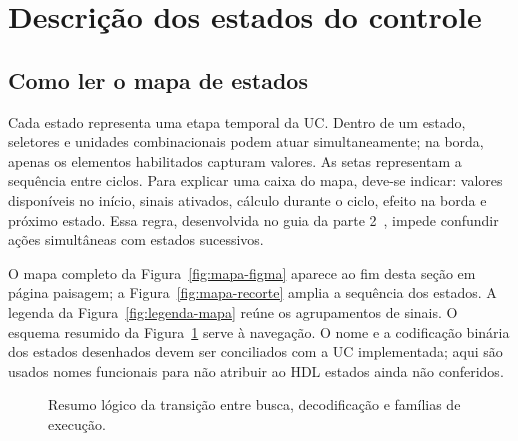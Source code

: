 \section{Descrição dos estados do controle}\label{sec:controle}

\subsection{Como ler o mapa de estados}\label{subsec:leitura-mapa}

Cada estado representa uma etapa temporal da UC. Dentro de um estado, seletores e unidades combinacionais podem atuar simultaneamente; na borda, apenas os elementos habilitados capturam valores. As setas representam a sequência entre ciclos. Para explicar uma caixa do mapa, deve-se indicar: valores disponíveis no início, sinais ativados, cálculo durante o ciclo, efeito na borda e próximo estado. Essa regra, desenvolvida no guia da parte 2~\cite{docpt2}, impede confundir ações simultâneas com estados sucessivos.

O mapa completo da Figura~\ref{fig:mapa-figma} aparece ao fim desta seção em página paisagem; a Figura~\ref{fig:mapa-recorte} amplia a sequência dos estados. A legenda da Figura~\ref{fig:legenda-mapa} reúne os agrupamentos de sinais. O esquema resumido da Figura~\ref{fig:fluxo-estados} serve à navegação. O nome e a codificação binária dos estados desenhados devem ser conciliados com a UC implementada; aqui são usados nomes funcionais para não atribuir ao HDL estados ainda não conferidos.

\begin{figure}[H]\centering
{}
\caption{Resumo lógico da transição entre busca, decodificação e famílias de execução.}\label{fig:fluxo-estados}
\end{figure}

